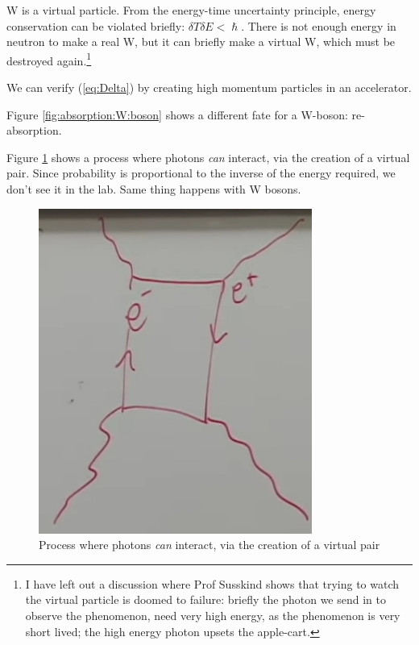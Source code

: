 \documentclass[]{article}
\begin{document}
 W is a virtual particle. From the energy-time uncertainty principle, energy conservation can be violated briefly: $\delta T \delta E<\hslash$. There is not enough energy in neutron to make a real W, but it can briefly make a virtual W, which must be destroyed again.\footnote{I have left out a discussion where Prof Susskind shows that trying to watch the virtual particle is doomed to failure: briefly the photon we send in to observe the phenomenon, need very high energy, as the phenomenon is very short lived; the high energy photon upsets the apple-cart.}
 
 We can verify (\ref{eq:Delta}) by creating high momentum particles in an accelerator.
 
 Figure \ref{fig:absorption:W:boson} shows a different fate for a W-boson: re-absorption.
 
 Figure \ref{fig:2-6-photons} shows a process where photons \emph{can} interact, via the creation of a virtual pair. Since probability is proportional to the inverse of the energy required, we don't see it in the lab. Same thing happens with W bosons.
 
 \begin{figure}[H]
 	\caption[Photon interaction via the creation of a virtual pair]{Process where photons \emph{can} interact, via the creation of a virtual pair}\label{fig:2-6-photons}
 	\includegraphics[width=0.8\textwidth]{2-6-photons}
 \end{figure}
\end{document}
